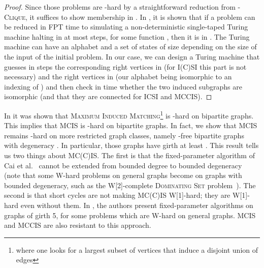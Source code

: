 \begin{proof}
Since those problems are -hard by a straightforward reduction from \textsc{-Clique}, it suffices to show membership in .
In \cite{Cesati03}, it is shown that if a problem can be reduced in FPT time 
to simulating a non-deterministic single-taped Turing machine halting in at 
most  steps, for some function , then it is in .
The Turing machine can have an alphabet and a set of states of size depending 
on the size of the input of the initial problem.
In our case, we can design a Turing machine that guesses in  steps the 
corresponding right  vertices in  (for I(C)SI this part is not 
necessary) and the right  vertices in  (our alphabet being isomorphic 
to an indexing of ) and then check in time  whether 
the two induced subgraphs are isomorphic (and that they are connected for ICSI 
and MCCIS).
\end{proof}



In \cite{MS09} it was shown that 
\textsc{Maximum Induced Matching}\footnote{where one looks for a largest 
subset of vertices that induce a disjoint union of edges} is -hard 
on bipartite graphs. This implies that MCIS is -hard on bipartite 
graphs. In fact, we show that MCIS remains -hard on more restricted 
graph classes, namely -free bipartite graphs with degeneracy .
In particular, those graphs have girth at least .
This result tells us two things about MC(C)IS.
The first is that the fixed-parameter algorithm of Cai et al.~\cite[Theorem 1]{Cai2006} 
cannot be extended from bounded degree to bounded degeneracy (note that some W-hard problems on general graphs become  on graphs with bounded degeneracy, such as the W[2]-complete \textsc{Dominating Set} problem~\cite{AlonG09}).
The second is that short cycles are not making MC(C)IS W[1]-hard; they are W[1]-hard even without them.
In \cite{RamanS08}, the authors present fixed-parameter algorithms on graphs 
of girth 5, for some problems which are W-hard on general graphs.
MCIS and MCCIS are also resistant to this approach.


